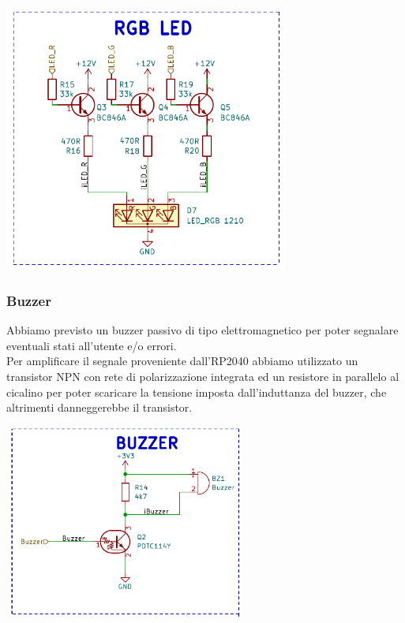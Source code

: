 \begin{center}
\includegraphics[width=3.68946in,height=3.49479in]{figures/image17.png}
\captionsetup{type=figure}
\end{center}

\hypertarget{buzzer}{%
\subsubsection{\texorpdfstring{\hfill\break
\hfill\break
Buzzer}{  Buzzer}}\label{buzzer}}

Abbiamo previsto un buzzer passivo di tipo elettromagnetico per poter
segnalare eventuali stati all'utente e/o errori.\\
Per amplificare il segnale proveniente dall'RP2040 abbiamo utilizzato un transistor NPN con
rete di polarizzazione integrata ed un resistore in parallelo al
cicalino per poter scaricare la tensione imposta dall'induttanza del
buzzer, che altrimenti danneggerebbe il transistor.

\begin{center}
\includegraphics[width=3.08958in,height=2.51619in]{figures/image38.png}
\captionsetup{type=figure}
\end{center}

